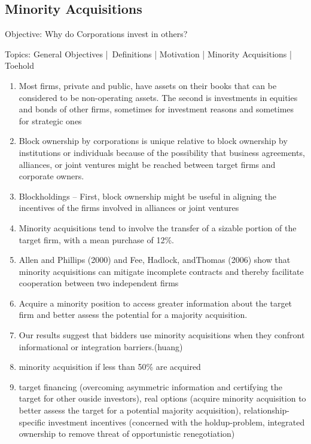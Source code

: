 \documentclass[12pt]{article}
\begin{document}
\subsection{Minority Acquisitions}
\begin{center}
	Objective: Why do Corporations invest in others? 
\end{center}
Topics: General Objectives | Definitions | Motivation | Minority Acquisitions | Toehold 

	\begin{enumerate}
		\item Most firms, private and public, have assets on their books that can be considered to be non-operating assets. The second is investments in equities and bonds of other firms, sometimes for investment reasons and sometimes for strategic ones \citep{Damodaran2005}
		\item Block ownership by corporations is unique relative to block ownership by institutions or individuals because of the possibility that business agreements, alliances, or joint ventures might be reached between target firms and corporate owners. \citep{Allen2000}
		\item Blockholdings -- First, block ownership might be useful in aligning the incentives of the firms involved in alliances or joint ventures \citep{Allen2000}
		\item Minority acquisitions tend to involve the transfer of a sizable portion of the target firm, with a mean purchase of 12\%. \citep{Ouimet2013}

		
		\item Allen and Phillips (2000) and Fee, Hadlock, andThomas (2006) show that minority acquisitions can mitigate incomplete contracts and thereby facilitate cooperation between two independent firms \citep{Ouimet2013}
		\item Acquire a minority position to access greater information about the target firm and better assess the potential for a majority acquisition. \citep{Ouimet2013}
		\item Our results suggest that bidders use minority acquisitions when they confront informational or integration barriers.(huang)
		\item minority acquisition if less than 50\% are acquired
		\item target financing (overcoming asymmetric information and certifying the target for other ouside investors), real options (acquire minority acquisition to better assess the target for a potential majority acquisition), relationship-specific investment incentives (concerned with the holdup-problem, integrated ownership to remove threat of opportunistic renegotiation)


\end{enumerate}
\end{document}
